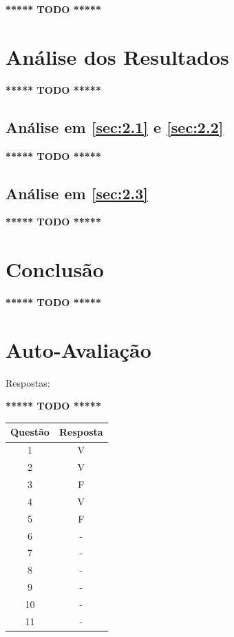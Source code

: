 \documentclass[12pt]{article}
\begin{document}
\textbf{***** TODO *****}

\section{Análise dos Resultados}
\label{sec:resultados}

\textbf{***** TODO *****}

\subsection{Análise em \ref{sec:2.1} e \ref{sec:2.2}}\label{sec:analise2.1}

\textbf{***** TODO *****}

\subsection{Análise em \ref{sec:2.3}}\label{sec:analise2.4}

\textbf{***** TODO *****}

\section{Conclusão}
\label{sec:Conclusao}

\textbf{***** TODO *****}

\nocite{*}



\newpage
\section*{Auto-Avaliação}

Respostas:

\textbf{***** TODO *****}

\begin{table}[H]
      \begin{tabular}{|c|c|} \hline
      \textbf{Questão} & \textbf{Resposta}\\
      \hline
      1  & V \\ \hline
      2  & V \\ \hline
      3  & F \\ \hline
      4  & V \\ \hline
      5  & F \\ \hline
      6  & - \\ \hline
      7  & - \\ \hline
      8  & - \\ \hline
      9  & - \\ \hline
      10 & - \\ \hline
      11 & - \\ \hline
      \end{tabular}
\end{table}
\end{document}
